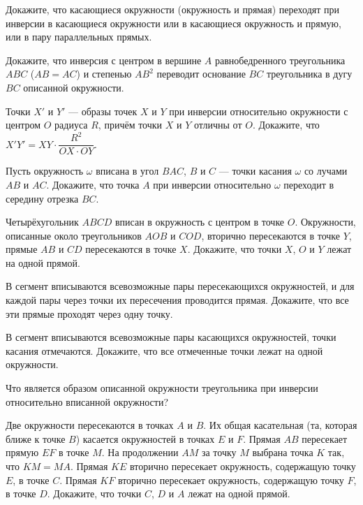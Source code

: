 \documentclass{article}
\begin{document}
\begin{enumerate_boxed}
        \item Докажите, что касающиеся окружности (окружность и прямая) переходят при инверсии в касающиеся окружности или в касающиеся окружность и прямую, или в пару параллельных прямых.

        \item Докажите, что инверсия с центром в вершине $A$ равнобедренного треугольника $ABC$ ($AB = AC$) и степенью $AB^2$ переводит основание $BC$ треугольника в дугу $BC$ описанной окружности.

        \item Точки $X'$ и $Y'$ — образы точек $X$ и $Y$ при инверсии относительно окружности с центром $O$ радиуса $R$, причём точки $X$ и $Y$ отличны от $O$.
        Докажите, что $X'Y' =XY \cdot \dfrac{R^2}{OX\cdot OY}$.

        \item Пусть окружность $\omega$ вписана в угол $BAC$, $B$ и $C$ — точки касания $\omega$ со лучами $AB$ и $AC$.
        Докажите, что точка $A$ при инверсии относительно $\omega$ переходит в середину отрезка $BC$.

        \item Четырёхугольник $ABCD$ вписан в окружность с центром в точке $O$.
        Окружности, описанные около треугольников $AOB$ и $COD$, вторично пересекаются в точке $Y$, прямые $AB$ и $CD$ пересекаются в точке $X$.
        Докажите, что точки $X$, $O$ и $Y$ лежат на одной прямой.

        \item В сегмент вписываются всевозможные пары пересекающихся окружностей, и для каждой пары через точки их пересечения проводится прямая.
        Докажите, что все эти прямые проходят через одну точку.

        \item В сегмент вписываются всевозможные пары касающихся окружностей, точки касания отмечаются.
        Докажите, что все отмеченные точки лежат на одной окружности.

        \item Что является образом описанной окружности треугольника при инверсии относительно вписанной окружности?

        \item Две окружности пересекаются в точках $A$ и $B$.
        Их общая касательная (та, которая ближе к точке $B$) касается окружностей в точках $E$ и $F$.
        Прямая $AB$ пересекает прямую $EF$ в точке $M$.
        На продолжении $AM$ за точку $M$ выбрана точка $K$ так, что $KM = MA$.
        Прямая $KE$ вторично пересекает окружность, содержащую точку $E$, в точке $C$.
        Прямая $KF$ вторично пересекает окружность, содержащую точку $F$, в точке $D$.
        Докажите, что точки $C$, $D$ и $A$ лежат на одной прямой.


\end{enumerate_boxed}
\end{document}
